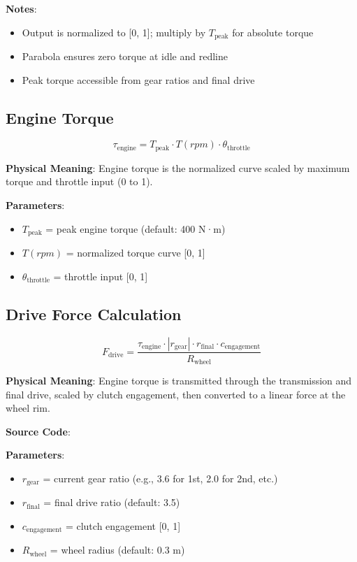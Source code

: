 \textbf{Notes}:
\begin{itemize}
  \item Output is normalized to [0, 1]; multiply by $T_{\text{peak}}$ for absolute torque
  \item Parabola ensures zero torque at idle and redline
  \item Peak torque accessible from gear ratios and final drive
\end{itemize}

\subsection{Engine Torque}

\begin{equation}
  \tau_{\text{engine}} = T_{\text{peak}} \cdot T(rpm) \cdot \theta_{\text{throttle}}
  \label{eq:engine-torque}
\end{equation}

\textbf{Physical Meaning}: Engine torque is the normalized curve scaled by maximum torque and throttle input (0 to 1).

\textbf{Parameters}:
\begin{itemize}
  \item $T_{\text{peak}}$ = peak engine torque (default: 400 N·m)
  \item $T(rpm)$ = normalized torque curve [0, 1]
  \item $\theta_{\text{throttle}}$ = throttle input [0, 1]
\end{itemize}

\subsection{Drive Force Calculation}

\begin{equation}
  F_{\text{drive}} = \frac{\tau_{\text{engine}} \cdot |r_{\text{gear}}| \cdot r_{\text{final}} \cdot c_{\text{engagement}}}{R_{\text{wheel}}}
  \label{eq:drive-force}
\end{equation}

\textbf{Physical Meaning}: Engine torque is transmitted through the transmission and final drive, scaled by clutch engagement, then converted to a linear force at the wheel rim.

\textbf{Source Code}: 

\textbf{Parameters}:
\begin{itemize}
  \item $r_{\text{gear}}$ = current gear ratio (e.g., 3.6 for 1st, 2.0 for 2nd, etc.)
  \item $r_{\text{final}}$ = final drive ratio (default: 3.5)
  \item $c_{\text{engagement}}$ = clutch engagement [0, 1]
  \item $R_{\text{wheel}}$ = wheel radius (default: 0.3 m)
\end{itemize}

